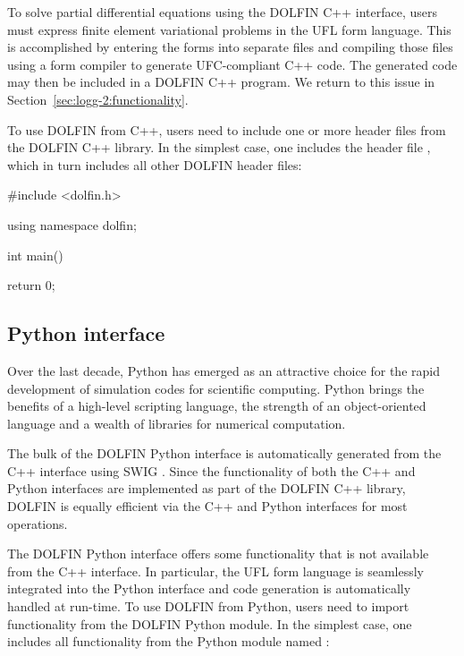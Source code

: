 To solve partial differential equations using the DOLFIN C++
interface, users must express finite element variational problems
in the UFL form language. This is accomplished by entering the forms
into separate  files and compiling those files using a form
compiler to generate UFC-compliant C++ code. The generated code may
then be included in a DOLFIN C++ program. We return to this issue in
Section~\ref{sec:logg-2:functionality}.

To use DOLFIN from C++, users need to include one or more header files
from the DOLFIN C++ library. In the simplest case, one includes the
header file , which in turn includes all other DOLFIN
header files:

\begin{c++}
#include <dolfin.h>

using namespace dolfin;

int main()
{

  return 0;
}
\end{c++}

\subsection{Python interface}

Over the last decade, Python has emerged as an attractive choice for
the rapid development of simulation codes for scientific computing.
Python brings the benefits of a high-level scripting language, the
strength of an object-oriented language and a wealth of libraries for
numerical computation.

The bulk of the DOLFIN Python interface is automatically generated
from the C++ interface using SWIG \citep{Beazley2006,www:swig}. Since
the functionality of both the C++ and Python interfaces are
implemented as part of the DOLFIN C++ library, DOLFIN is equally
efficient via the C++ and Python interfaces for most operations.

The DOLFIN Python interface offers some functionality that is not
available from the C++ interface. In particular, the UFL form language
is seamlessly integrated into the Python interface and code generation
is automatically handled at run-time.  To use DOLFIN from Python,
users need to import functionality from the DOLFIN Python module. In
the simplest case, one includes all functionality from the Python
module named :

